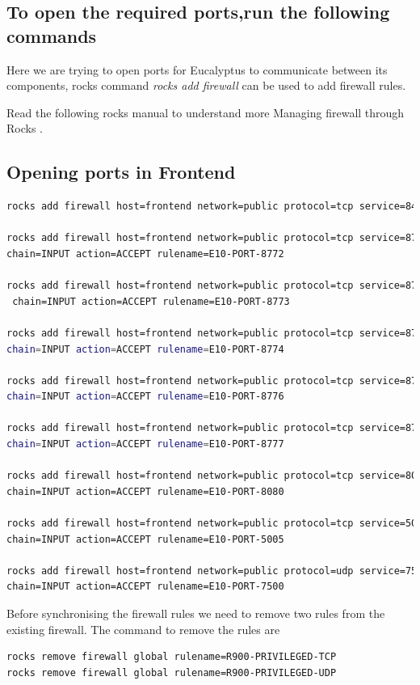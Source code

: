 \subsection{To open the required ports,run the following commands}
Here we are trying to open ports for Eucalyptus to communicate between its components, rocks command \emph{rocks add firewall} can be used to add firewall rules. 

Read the following rocks manual to understand more Managing firewall through Rocks \cite{mfirewal}.

\subsection{Opening ports in Frontend}
\begin{lstlisting}[language=bash]
rocks add firewall host=frontend network=public protocol=tcp service=8443 \ chain=INPUT action=ACCEPT rulename=E10-PORT-8443

rocks add firewall host=frontend network=public protocol=tcp service=8772 \
chain=INPUT action=ACCEPT rulename=E10-PORT-8772

rocks add firewall host=frontend network=public protocol=tcp service=8773 \
 chain=INPUT action=ACCEPT rulename=E10-PORT-8773

rocks add firewall host=frontend network=public protocol=tcp service=8774 \ 
chain=INPUT action=ACCEPT rulename=E10-PORT-8774

rocks add firewall host=frontend network=public protocol=tcp service=8776 \ 
chain=INPUT action=ACCEPT rulename=E10-PORT-8776

rocks add firewall host=frontend network=public protocol=tcp service=8777 \ 
chain=INPUT action=ACCEPT rulename=E10-PORT-8777

rocks add firewall host=frontend network=public protocol=tcp service=8080 \
chain=INPUT action=ACCEPT rulename=E10-PORT-8080

rocks add firewall host=frontend network=public protocol=tcp service=5005 \
chain=INPUT action=ACCEPT rulename=E10-PORT-5005

rocks add firewall host=frontend network=public protocol=udp service=7500 \
chain=INPUT action=ACCEPT rulename=E10-PORT-7500
\end{lstlisting}


Before synchronising the firewall rules we need to remove two rules from the existing firewall.
The command to remove the rules are 
\begin{lstlisting}[language=bash]
rocks remove firewall global rulename=R900-PRIVILEGED-TCP
rocks remove firewall global rulename=R900-PRIVILEGED-UDP
\end{lstlisting}
